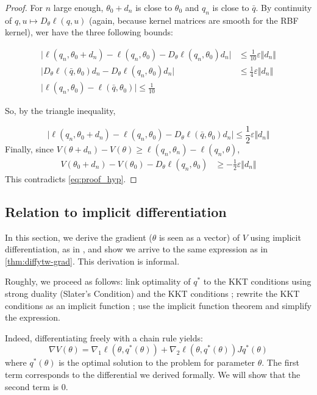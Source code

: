 \begin{proof}
   For $n$ large enough, $\theta_0 + d_n$ is close to $\theta_0$ and $q_n$ is close to $\bar q$. By continuity of $q, u \mapsto D_\theta\ell(q, u)$ (again, because kernel matrices are smooth for the RBF kernel), wer have the three following bounds:

   \begin{align}
       \vert \ell(q_n, \theta_0 + d_n) - \ell(q_n, \theta_0) - D_\theta \ell(q_n, \theta_0)d_n\vert &\leq \frac{1}{10} \varepsilon \Vert d_n \Vert\\
        \vert D_\theta \ell(\bar q, \theta_0)d_n - D_\theta \ell(q_n, \theta_0)d_n\vert &\leq \frac{1}{4}\varepsilon \Vert d_n \Vert\\
        \vert \ell(q_n, \theta_0) - \ell(\bar q, \theta_0) \vert \leq \frac{1}{10}
    \end{align}

    So, by the triangle inequality,

    \begin{equation}
       \vert \ell(q_n, \theta_0 + d_n) - \ell(q_n, \theta_0) - D_\theta \ell(\bar q, \theta_0)d_n\vert \leq \frac{1}{2} \varepsilon \Vert d_n \Vert
    \end{equation}
    Finally, since $V(\theta + d_n) - V(\theta) \geq \ell(q_n, \theta_n) - \ell(q_n, \theta)$,
    \begin{align}
        V(\theta_0 + d_n) - V(\theta_0) - D_\theta \ell(q_n, \theta_0)&\geq-\frac{1}{2}\varepsilon\Vert d_n\Vert
    \end{align}
    This contradicts \cref{eq:proof_hyp}.
\end{proof}






\subsection{Relation to implicit differentiation}\label{sec:lagrangian}
In this section, we derive the gradient ($\theta$ is seen as a vector) of $V$ using implicit differentiation, as in \citet{QP-Layer,optnet}, and show we arrive to the same expression as in \cref{thm:diffytw-grad}. This derivation is informal.


Roughly, we proceed as follows: link optimality of $q^*$ to the KKT conditions using strong duality (Slater's Condition) and the KKT conditions ; rewrite the KKT conditions as an implicit function ; use the implicit function theorem and simplify the expression.

Indeed, differentiating freely with a chain rule yields:
\begin{equation}\label{eq:lagrangian-first}
    \nabla V(\theta) = \nabla_1 \ell(\theta, q^*(\theta)) + \nabla_2 \ell(\theta, q^*(\theta))J q^*(\theta)
\end{equation}
where $q^*(\theta)$ is the optimal solution to the problem for parameter $\theta$. The first term corresponds to the differential we derived formally. We will show that the second term is $0$.

